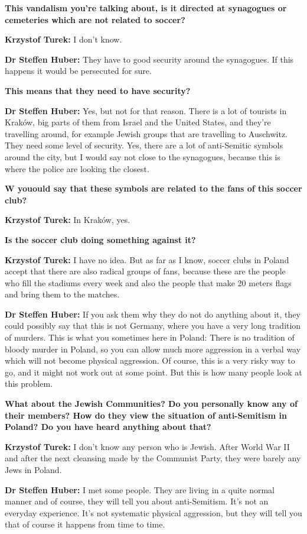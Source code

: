 \textbf{This vandalism you're talking about, is it directed at synagogues or cemeteries which are not related to soccer?} 

\textbf{Krzystof Turek:} I don't know.\par
\textbf{Dr Steffen Huber:} They have to good security around the synagogues. If this happens it would be persecuted for sure. 

\textbf{This means that they need to have security?}  

\textbf{Dr Steffen Huber:} Yes, but not for that reason. There is a lot of tourists in Kraków, big parts of them from Israel and the United States, and they're travelling around, for example Jewish groups that are travelling to Auschwitz. They need some level of security. Yes, there are a lot of anti-Semitic symbols around the city, but I would say not close to the synagogues, because this is where the police are looking the closest. 

\textbf{W youould say that these symbols are related to the fans of this soccer club?} 

\textbf{Krzystof Turek:} In Kraków, yes. 

\textbf{Is the soccer club doing something against it?} 

\textbf{Krzystof Turek:} I have no idea. But as far as I know, soccer clubs in Poland accept that there are also radical groups of fans, because these are the people who fill the stadiums every week and also the people that make 20 meters flags and bring them to the matches. \par
\textbf{Dr Steffen Huber:} If you ask them why they do not do anything about it, they could possibly say that this is not Germany, where you have a very long tradition of murders. This is what you sometimes here in Poland: There is no tradition of bloody murder in Poland, so you can allow much more aggression in a verbal way which will not become physical aggression. Of course, this is a very risky way to go, and it might not work out at some point. But this is how many people look at this problem. 

\textbf{What about the Jewish Communities? Do you personally know any of their members? How do they view the situation of anti-Semitism in Poland? Do you have heard anything about that?}  

\textbf{Krzystof Turek:} I don’t know any person who is Jewish. After World War II and after the next cleansing made by the Communist Party, they were barely any Jews in Poland. \par
\textbf{Dr Steffen Huber:} I met some people. They are living in a quite normal manner and of course, they will tell you about anti-Semitism. It’s not an everyday experience. It's not systematic physical aggression, but they will tell you that of course it happens from time to time. 


